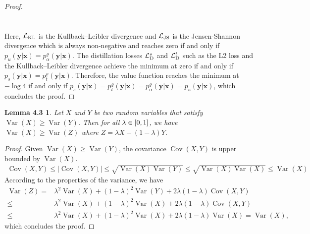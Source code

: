 \documentclass{article}
\newtheorem*{lemma1}{Lemma 4.3}
\newcommand{\OVEC}[1]{\bm{#1}} %
\newcommand{\LOSS}[2]{\mathcal{#1}_{\rm{#2}}} %
\DeclareMathOperator{\COV}{Cov}
\DeclareMathOperator{\VAR}{Var}
\newcommand{\stddistloss}{\LOSS{L}{D}^{s}}
\newcommand{\tchdistloss}{\LOSS{L}{D}^{t}}
\newcommand{\fullpdat}{p_{u}(\OVEC{y}|\OVEC{x})}
\newcommand{\fullpstd}[1]{p_{s}(#1|\OVEC{x})}
\newcommand{\fullptch}[1]{p_{t}^{\varrho}(#1|\OVEC{x})}
\newcommand{\fullpmix}{p_{\alpha}^{\varrho}(\OVEC{y}|\OVEC{x})}
\begin{document}
\begin{proof}
\begin{small}
\begin{equation*}
\begin{aligned}
\\
\end{aligned}
\end{equation*}%
\end{small}%
Here, $\LOSS{L}{KL}$ is the Kullback–Leibler divergence and $\LOSS{L}{JS}$ is the Jensen-Shannon divergence which is always non-negative and reaches zero if and only if $\fullpdat=\fullpmix$.
The distillation losses $\stddistloss$ and $\tchdistloss$ such as the L2 loss and the Kullback–Leibler divergence achieve the minimum at zero if and only if $\fullpstd{\OVEC{y}}=\fullptch{\OVEC{y}}$.
Therefore, the value function reaches the minimum at $-\log 4$ if and only if $\fullpstd{\OVEC{y}}=\fullptch{\OVEC{y}}=\fullpmix=\fullpdat$, which concludes the proof.
\end{proof}

\begin{lemma1}
Let $X$ and $Y$ be two random variables that satisfy $\VAR(X)\geq\VAR(Y)$.
Then for all $\lambda\in\interval{0}{1}$, we have $\VAR(X)\geq\VAR(Z)$ where $Z = \lambda X+ (1-\lambda) Y$.
\end{lemma1}
 
\begin{proof}
Given $\VAR(X)\geq\VAR(Y)$, the covariance $\COV(X,Y)$ is upper bounded by $\VAR(X)$.
\begin{equation}
\begin{aligned}
\COV(X,Y)
\leq
|\COV(X,Y)|
\leq
\sqrt{\VAR(X)\VAR(Y)}
\leq
\sqrt{\VAR(X)\VAR(X)}
\leq
\VAR(X)
\end{aligned}
\end{equation}%
According to the properties of the variance, we have
\begin{equation}
\begin{aligned}
\VAR(Z)
=
&
\lambda^{2}\VAR(X)
+
(1-\lambda)^{2}\VAR(Y)
+
2\lambda(1-\lambda)\COV(X,Y)
\\
\leq
&
\lambda^{2}\VAR(X)
+
(1-\lambda)^{2}\VAR(X)
+
2\lambda(1-\lambda)\COV(X,Y)
\\
\leq
&
\lambda^{2}\VAR(X)
+
(1-\lambda)^{2}\VAR(X)
+
2\lambda(1-\lambda)\VAR(X)
=
\VAR(X)
\text{,}
\end{aligned}
\end{equation}%
which concludes the proof.
\end{proof}
\end{document}
